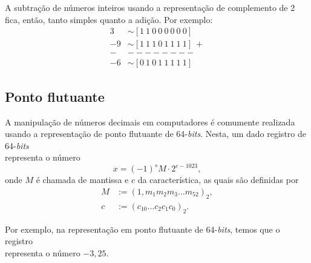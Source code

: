 A subtração de números inteiros usando a representação de complemento de 2 fica, então, tanto simples quanto a adição. Por exemplo:
\begin{align}
  3 &\sim [1 ~ 1 ~ 0 ~ 0 ~ 0 ~ 0 ~ 0 ~ 0]\\
 -9 &\sim [1 ~ 1 ~ 1 ~ 0 ~ 1 ~ 1 ~ 1 ~ 1] ~ + \\
  - & -------- \\
 -6 &\sim [0 ~ 1 ~ 0 ~ 1 ~ 1 ~ 1 ~ 1 ~ 1]
\end{align}


\subsection{Ponto flutuante}

A manipulação de números decimais em computadores é comumente realizada usando a representação de ponto flutuante de 64-{\it bits}. Nesta, um dado registro de 64-{\it bits}
\begin{equation}
  [m_{52} ~ m_{51} ~ m_{50} ~ \cdots ~ m_{1} ~ | ~ c_0 ~ c_1 ~ c_2 ~ \cdots ~ c_{10} ~ | ~ s]
\end{equation}
representa o número
\begin{equation}
  x = (-1)^s M\cdot 2^{c - 1023},
\end{equation}
onde $M$ é chamada de mantissa e $c$ da característica, as quais são definidas por
\begin{align}
  M &:= (1,m_1m_2m_3\ldots m_{52})_2,\\
  c &:= (c_{10}\ldots c_2c_1c_0)_2.
\end{align}

\begin{ex}
  Por exemplo, na representação em ponto flutuante de 64-{\it bits}, temos que o registro
  \begin{equation}
    [0 ~ 0 ~ 0 ~ \cdots ~ 0 ~ 1 ~ 0 ~ 1 ~ | ~ 0 ~ 0 ~ 0 ~ \cdots ~ 0 ~ 1 ~ | ~ 1]
  \end{equation}
representa o número $-3,25$.
\end{ex}

